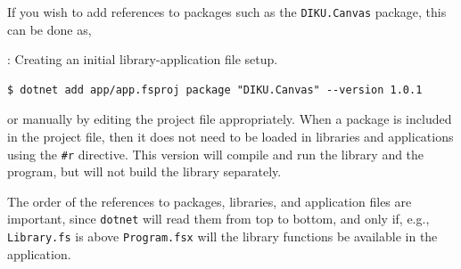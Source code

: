 \documentclass[fsharpNotes.tex]{subfiles}
\begin{document}
If you wish to add references to packages such as the \lstinline{DIKU.Canvas} package, this can be done as,
\begin{codeNOutput}[label=dotnetAdd,
  top=-5pt,
  bottom=-5pt,
  left=-2pt,
  right=-2pt,
]{: Creating an initial library-application file setup.}
  \begin{lstlisting}[language=console,escapechar=§]
$ dotnet add app/app.fsproj package "DIKU.Canvas" --version 1.0.1
\end{lstlisting}%
\end{codeNOutput}
or manually by editing the project file appropriately. When a package is included in the project file, then it does not need to be loaded in libraries and applications using the \lstinline{#r} directive. This version will compile and run the library and the program, but will not build the library separately.

The order of the references to packages, libraries, and application files are important, since \lstinline[language=console]{dotnet} will read them from top to bottom, and only if, e.g., \lstinline[language=console]{Library.fs} is above \lstinline[language=console]{Program.fsx} will the library functions be available in the application.
\end{document}
